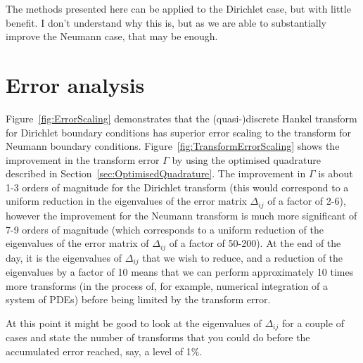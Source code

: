 \documentclass[aip,amsmath,amssymb,reprint,twocolumn]{revtex4-1}
\begin{document}
The methods presented here can be applied to the Dirichlet case, but with little benefit.  I don't understand why this is, but as we are able to substantially improve the Neumann case, that may be enough.



\section{Error analysis}
\label{sec:ErrorAnalysis}

Figure~\ref{fig:ErrorScaling} demonstrates that the (quasi-)discrete Hankel transform for Dirichlet boundary conditions has superior error scaling to the transform for Neumann boundary conditions.  Figure~\ref{fig:TransformErrorScaling} shows the improvement in the transform error $\Gamma$ by using the optimised quadrature described in Section~\ref{sec:OptimisedQuadrature}.  The improvement in $\Gamma$ is about 1-3 orders of magnitude for the Dirichlet transform (this would correspond to a uniform reduction in the eigenvalues of the error matrix $\Delta_{ij}$ of a factor of 2-6), however the improvement for the Neumann transform is much more significant of 7-9 orders of magnitude (which corresponds to a uniform reduction of the eigenvalues of the error matrix of $\Delta_{ij}$ of a factor of 50-200).  At the end of the day, it is the eigenvalues of $\Delta_{ij}$ that we wish to reduce, and a reduction of the eigenvalues by a factor of 10 means that we can perform approximately 10 times more transforms (in the process of, for example, numerical integration of a system of PDEs) before being limited by the transform error.

At this point it might be good to look at the eigenvalues of $\Delta_{ij}$ for a couple of cases and state the number of transforms that you could do before the accumulated error reached, say, a level of 1\%.
\end{document}
